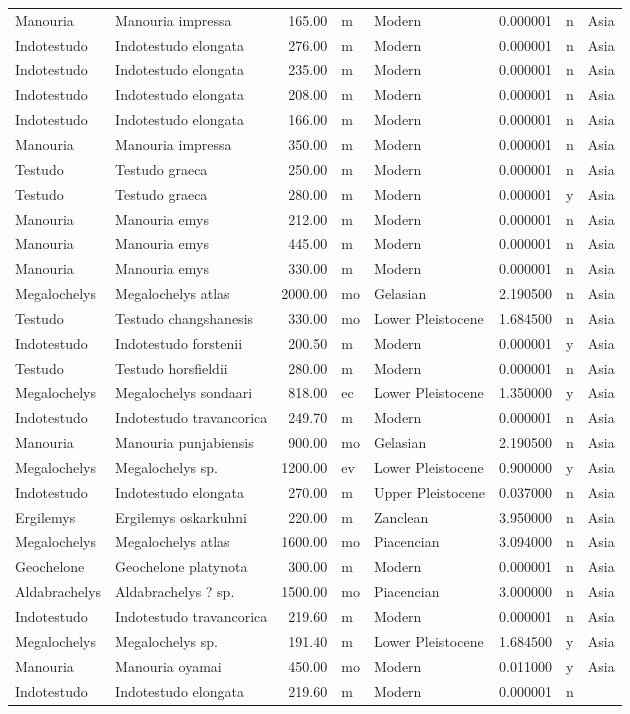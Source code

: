 \begin{landscape}
\begin{longtable}[]{@{}llrllrll@{}}
	Manouria & Manouria impressa & 165.00 & m & Modern & 0.000001 & n &
	Asia\tabularnewline
	Indotestudo & Indotestudo elongata & 276.00 & m & Modern & 0.000001 & n
	& Asia\tabularnewline
	Indotestudo & Indotestudo elongata & 235.00 & m & Modern & 0.000001 & n
	& Asia\tabularnewline
	Indotestudo & Indotestudo elongata & 208.00 & m & Modern & 0.000001 & n
	& Asia\tabularnewline
	Indotestudo & Indotestudo elongata & 166.00 & m & Modern & 0.000001 & n
	& Asia\tabularnewline
	Manouria & Manouria impressa & 350.00 & m & Modern & 0.000001 & n &
	Asia\tabularnewline
	Testudo & Testudo graeca & 250.00 & m & Modern & 0.000001 & n &
	Asia\tabularnewline
	Testudo & Testudo graeca & 280.00 & m & Modern & 0.000001 & y &
	Asia\tabularnewline
	Manouria & Manouria emys & 212.00 & m & Modern & 0.000001 & n &
	Asia\tabularnewline
	Manouria & Manouria emys & 445.00 & m & Modern & 0.000001 & n &
	Asia\tabularnewline
	Manouria & Manouria emys & 330.00 & m & Modern & 0.000001 & n &
	Asia\tabularnewline
	Megalochelys & Megalochelys atlas & 2000.00 & mo & Gelasian & 2.190500 &
	n & Asia\tabularnewline
	Testudo & Testudo changshanesis & 330.00 & mo & Lower Pleistocene &
	1.684500 & n & Asia\tabularnewline
	Indotestudo & Indotestudo forstenii & 200.50 & m & Modern & 0.000001 & y
	& Asia\tabularnewline
	Testudo & Testudo horsfieldii & 280.00 & m & Modern & 0.000001 & n &
	Asia\tabularnewline
	Megalochelys & Megalochelys sondaari & 818.00 & ec & Lower Pleistocene &
	1.350000 & y & Asia\tabularnewline
	Indotestudo & Indotestudo travancorica & 249.70 & m & Modern & 0.000001
	& n & Asia\tabularnewline
	Manouria & Manouria punjabiensis & 900.00 & mo & Gelasian & 2.190500 & n
	& Asia\tabularnewline
	Megalochelys & Megalochelys sp. & 1200.00 & ev & Lower Pleistocene &
	0.900000 & y & Asia\tabularnewline
	Indotestudo & Indotestudo elongata & 270.00 & m & Upper Pleistocene &
	0.037000 & n & Asia\tabularnewline
	Ergilemys & Ergilemys oskarkuhni & 220.00 & m & Zanclean & 3.950000 & n
	& Asia\tabularnewline
	Megalochelys & Megalochelys atlas & 1600.00 & mo & Piacencian & 3.094000
	& n & Asia\tabularnewline
	Geochelone & Geochelone platynota & 300.00 & m & Modern & 0.000001 & n &
	Asia\tabularnewline
	Aldabrachelys & Aldabrachelys ? sp. & 1500.00 & mo & Piacencian &
	3.000000 & n & Asia\tabularnewline
	Indotestudo & Indotestudo travancorica & 219.60 & m & Modern & 0.000001
	& n & Asia\tabularnewline
	Megalochelys & Megalochelys sp. & 191.40 & m & Lower Pleistocene &
	1.684500 & y & Asia\tabularnewline
	Manouria & Manouria oyamai & 450.00 & mo & Modern & 0.011000 & y &
	Asia\tabularnewline
	Indotestudo & Indotestudo elongata & 219.60 & m & Modern & 0.000001 & n

\end{longtable}
\end{landscape}
